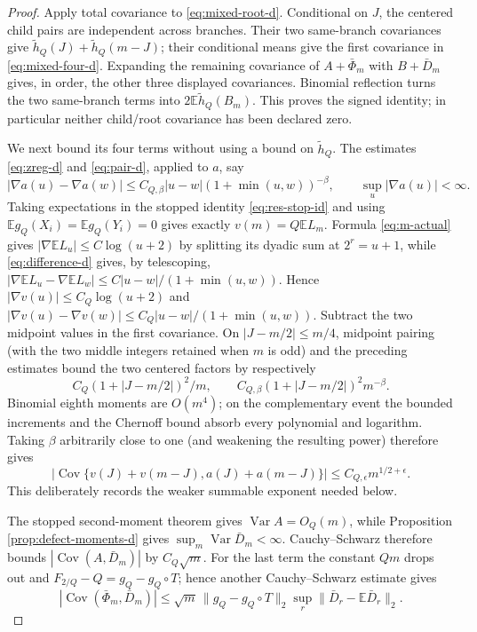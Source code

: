 \documentclass[11pt]{article}
\numberwithin{equation}{section}
\newcommand{\E}{\mathbb E}\newcommand{\Pp}{\mathbb P}
\newcommand{\Var}{\operatorname{Var}}\newcommand{\Cov}{\operatorname{Cov}}
\newcommand{\1}{\mathbf 1}\newcommand{\F}{\mathcal F}\newcommand{\D}{\mathcal D}
\begin{document}
\begin{proof}
Apply total covariance to \eqref{eq:mixed-root-d}.  Conditional on $J$, the
centered child pairs are independent across branches.  Their two same-branch
covariances give $\widetilde h_Q(J)+\widetilde h_Q(m-J)$; their conditional
means give the first covariance in \eqref{eq:mixed-four-d}.  Expanding the
remaining covariance of $A+\bar\Phi_m$ with $B+\bar D_m$ gives, in order,
the other three displayed covariances.  Binomial reflection turns the two
same-branch terms into $2\E\widetilde h_Q(B_m)$.  This proves the signed
identity; in particular neither child/root covariance has been declared zero.

We next bound its four terms without using a bound on $\widetilde h_Q$.
The estimates \eqref{eq:zreg-d} and \eqref{eq:pair-d}, applied to $a$, say
\[
 |\nabla a(u)-\nabla a(w)|\le C_{Q,\beta}|u-w|
 (1+\min(u,w))^{-\beta},\qquad \sup_u|\nabla a(u)|<\infty.
\]
Taking expectations in the stopped identity \eqref{eq:res-stop-id}
and using $\E g_Q(X_i)=\E g_Q(Y_i)=0$ gives exactly
$v(m)=Q\E L_m$.  Formula \eqref{eq:m-actual} gives
$|\nabla\E L_u|\le C\log(u+2)$ by splitting its dyadic sum at
$2^r=u+1$, while \eqref{eq:difference-d} gives, by telescoping,
$|\nabla\E L_u-\nabla\E L_w|\le
 C|u-w|/(1+\min(u,w))$.  Hence
$|\nabla v(u)|\le C_Q\log(u+2)$ and
$|\nabla v(u)-\nabla v(w)|\le
 C_Q|u-w|/(1+\min(u,w))$.
Subtract the two midpoint values in the first covariance.  On
$|J-m/2|\le m/4$, midpoint pairing (with the two middle integers retained
when $m$ is odd) and the preceding estimates bound the two centered factors
by respectively
\[
 C_Q(1+|J-m/2|)^2/m,\qquad
 C_{Q,\beta}(1+|J-m/2|)^2m^{-\beta}.
\]
Binomial eighth moments are $O(m^4)$; on the complementary event the bounded
increments and the Chernoff bound absorb every polynomial and logarithm.
Taking $\beta$ arbitrarily close to one (and weakening the resulting power)
therefore gives
\begin{equation}
 |\Cov\{v(J)+v(m-J),a(J)+a(m-J)\}|
 \le C_{Q,\epsilon}m^{1/2+\epsilon}.                  \label{eq:childmeans-mix-d}
\end{equation}
This deliberately records the weaker summable exponent needed below.

The stopped second-moment theorem gives $\Var A=O_Q(m)$, while Proposition
\ref{prop:defect-moments-d} gives $\sup_m\Var\bar D_m<\infty$.
Cauchy--Schwarz therefore bounds $|\Cov(A,\bar D_m)|$ by $C_Q\sqrt m$.
For the last term the constant $Qm$ drops out and
$F_{2/Q}-Q=g_Q-g_Q\circ T$; hence another Cauchy--Schwarz estimate gives
\begin{equation}
 |\Cov(\bar\Phi_m,\bar D_m)|
 \le\sqrt{m}\,\|g_Q-g_Q\circ T\|_2
       \sup_r\|\bar D_r-\E\bar D_r\|_2.               \label{eq:rootroot-mix-d}
\end{equation}


\end{proof}
\end{document}
